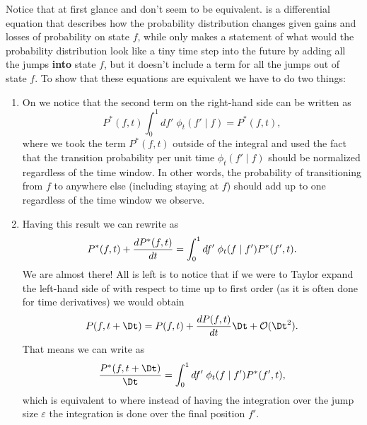 Notice that at first glance  and
 don't seem to be equivalent.
 is a differential equation that describes how the
probability distribution changes given gains and losses of probability on state
$f$, while  only makes a statement of what would the
probability distribution look like a tiny time step into the future by adding
all the jumps \textbf{into} state $f$, but it doesn't include a term for all the
jumps out of state $f$. To show that these equations are equivalent we have to
do two things:
\begin{enumerate}
  \item On  we notice that the second term on the
  right-hand side can be written as
  \begin{equation}
    P^*(f, t)\int_0^1 df' \; \phi_t(f' \mid f) = P^*(f, t),
    \label{eq_integral_transition}
  \end{equation}
  where we took the term $P^*(f, t)$ outside of the integral and used the fact
  that the transition probability per unit time $\phi_t(f' \mid f)$ should be
  normalized regardless of the time window. In other words, the probability of
  transitioning from $f$ to anywhere else (including staying at $f$) should add
  up to one regardless of the time window we observe.
  \item Having this result we can rewrite  as
  \begin{equation}
    P^*(f, t) + {d{P^*(f, t)} \over dt} = \int_0^1 df' \;
    \phi_t(f \mid f') P^*(f', t).
    \label{eq_master_eq_rearange}
  \end{equation}
  We are almost there! All is left is to notice that if we were to Taylor expand
  the left-hand side of  with respect to time up to
  first order (as it is often done for time derivatives) we would obtain
  \begin{equation}
    P(f, t + \Dt) = P(f, t) + \dt{P(f, t)}\Dt + \mathcal{O}(\Dt^2).
  \end{equation}
  That means we can write  as
  \begin{equation}
    {P^*(f, t + \Dt) \over \Dt} = \int_0^1 df' \;
    \phi_t(f \mid f') P^*(f', t),
  \end{equation}
  which is equivalent to  where instead of having
  the integration over the jump size $\varepsilon$ the integration is done over
  the final position $f'$.
\end{enumerate}
